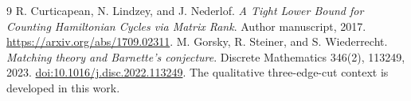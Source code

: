 \documentclass[10pt]{article}
\begin{document}
\begin{thebibliography}{9}
R. Curticapean, N. Lindzey, and J. Nederlof.
\emph{A Tight Lower Bound for Counting Hamiltonian Cycles via Matrix Rank}.
Author manuscript, 2017. \url{https://arxiv.org/abs/1709.02311}.
M. Gorsky, R. Steiner, and S. Wiederrecht.
\emph{Matching theory and Barnette's conjecture}.
Discrete Mathematics 346(2), 113249, 2023.
\href{https://doi.org/10.1016/j.disc.2022.113249}{doi:10.1016/j.disc.2022.113249}.
The qualitative three-edge-cut context is developed in this work.
\end{thebibliography}
\end{document}
